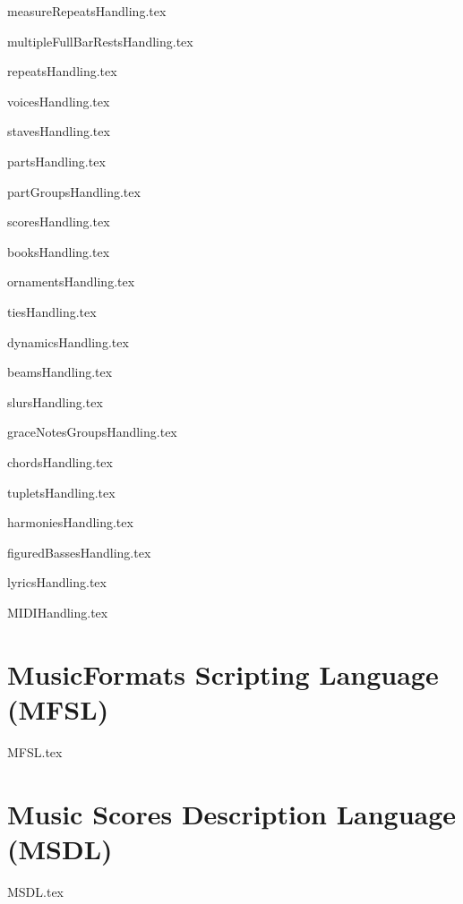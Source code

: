 \documentclass[11pt,a4paper]{report}
\begin{document}
{measureRepeatsHandling.tex}

{multipleFullBarRestsHandling.tex}

{repeatsHandling.tex}

{voicesHandling.tex}

{stavesHandling.tex}

{partsHandling.tex}

{partGroupsHandling.tex}

{scoresHandling.tex}

{booksHandling.tex}

{ornamentsHandling.tex}

{tiesHandling.tex}

{dynamicsHandling.tex}

{beamsHandling.tex}

{slursHandling.tex}

{graceNotesGroupsHandling.tex}

{chordsHandling.tex}

{tupletsHandling.tex}

{harmoniesHandling.tex}

{figuredBassesHandling.tex}

{lyricsHandling.tex}

{MIDIHandling.tex}


\part{MusicFormats Scripting Language (MFSL)}

{MFSL.tex}


\part{Music Scores Description Language (MSDL)}

{MSDL.tex}


\end{document}
